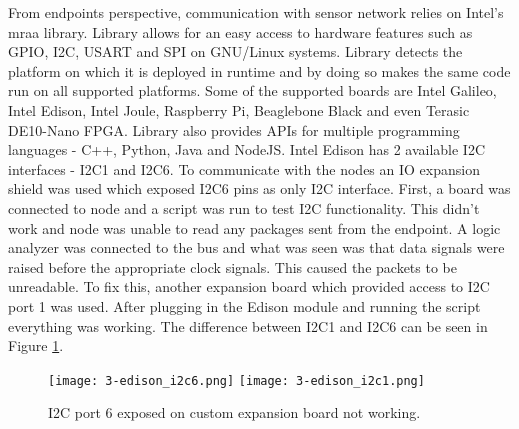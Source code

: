 From endpoints perspective, communication with sensor network relies on Intel's mraa library\cite{mraa}. Library allows for an easy access to hardware features such as \ac{GPIO}, \ac{I2C}, \ac{USART} and \ac{SPI} on GNU/Linux systems. Library detects the platform on which it is deployed in runtime and by doing so makes the same code run on all supported platforms. Some of the supported boards are Intel Galileo, Intel Edison, Intel Joule, Raspberry Pi, Beaglebone Black and even Terasic DE10-Nano \ac{FPGA}. Library also provides \ac{API}s for multiple programming languages - C++, Python, Java and NodeJS. Intel Edison has 2 available I2C interfaces - I2C1 and I2C6. To communicate with the nodes an IO expansion shield was used which exposed I2C6 pins as only \ac{I2C} interface\cite{ioexpansion}. First, a board was connected to node and a script was run to test \ac{I2C} functionality. This didn't work and node was unable to read any packages sent from the endpoint. A logic analyzer was connected to the bus and what was seen was that data signals were raised before the appropriate clock signals. This caused the packets to be unreadable. To fix this, another expansion board which provided access to I2C port 1 was used. After plugging in the Edison module and running the script everything was working. The difference between I2C1 and I2C6 can be seen in Figure \ref{fig:endpoint_i2c16}.

\begin{figure}[h]
  \begin{center}
    \texttt{[image: 3-edison\_i2c6.png]}
    \texttt{[image: 3-edison\_i2c1.png]}
  \end{center}
  \caption{I2C port 6 exposed on custom expansion board not working.}
  \label{fig:endpoint_i2c16}
\end{figure}


